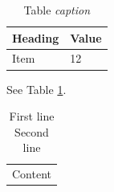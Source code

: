 \begin{longtable}{ll}
\caption[Short title]{Table \emph{caption}}
\label{table}\\
Heading & Value\\
\hline
Item & 12\\
\end{longtable}

See Table \ref{table}.

\begin{longtable}{l}
\caption{First line\\Second line}\\
Content\\
\end{longtable}
